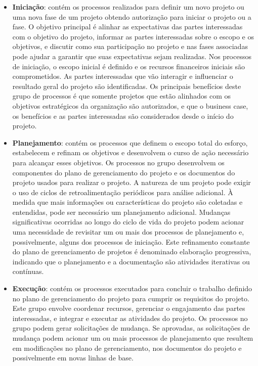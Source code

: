 \documentclass[
	12pt,
	openright,
	twoside,
	a4paper,
	english,
	brazil
	]{abntex2}
\begin{document}
\begin{itemize}
  \item \textbf{Iniciação}: contém os processos realizados para definir um novo projeto ou uma nova fase de um projeto obtendo autorização para iniciar o projeto ou a fase. O objetivo principal é alinhar as expectativas das partes interessadas com o objetivo do projeto, informar as partes interessadas sobre o escopo e os objetivos, e discutir como sua participação no projeto e nas fases associadas pode ajudar a garantir que suas expectativas sejam realizadas. Nos processos de iniciação, o escopo inicial é definido e os recursos financeiros iniciais são comprometidos. As partes interessadas que vão interagir e influenciar o resultado geral do projeto são identificadas. Os principais benefícios deste grupo de processos é que somente projetos que estão alinhados com os objetivos estratégicos da organização são autorizados, e que o business case, os benefícios e as partes interessadas são considerados desde o início do projeto.
  \item \textbf{Planejamento}: contém os processos que definem o escopo total do esforço, estabelecem e refinam os objetivos e desenvolvem o curso de ação necessário para alcançar esses objetivos. Os processos no grupo desenvolvem os componentes do plano de gerenciamento do projeto e os documentos do projeto usados para realizar o projeto. A natureza de um projeto pode exigir o uso de ciclos de retroalimentação periódicos para análise adicional. À medida que mais informações ou características do projeto são coletadas e entendidas, pode ser necessário um planejamento adicional. Mudanças significativas ocorridas ao longo do ciclo de vida do projeto podem acionar uma necessidade de revisitar um ou mais dos processos de planejamento e, possivelmente, alguns dos processos de iniciação. Este refinamento constante do plano de gerenciamento de projetos é denominado elaboração progressiva, indicando que o planejamento e a documentação são atividades iterativas ou contínuas.
  \item \textbf{Execução}: contém os processos executados para concluir o trabalho definido no plano de gerenciamento do projeto para cumprir os requisitos do projeto. Este grupo envolve coordenar recursos, gerenciar o engajamento das partes interessadas, e integrar e executar as atividades do projeto. Os processos no grupo podem gerar solicitações de mudança. Se aprovadas, as solicitações de mudança podem acionar um ou mais processos de planejamento que resultem em modificações no plano de gerenciamento, nos documentos do projeto e possivelmente em novas linhas de base.

\end{itemize}
\end{document}

